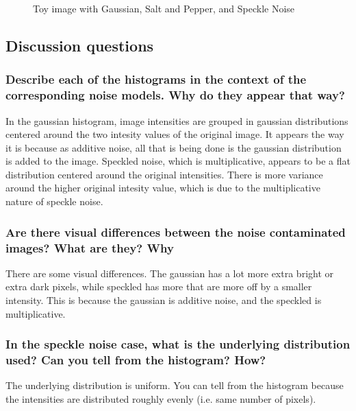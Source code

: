 \documentclass[article, 1.5space, letterpaper, 12pt, oneside, header, footer]{SydeClass}
\begin{document}
\begin{figure}[ht]
{	}
	\caption{Toy image with Gaussian, Salt and Pepper, and Speckle Noise}
	\label{fig:noiseGeneration.toy}
\end{figure}
 

\subsection{Discussion questions}

\subsubsection{ Describe each of the histograms in the context of the corresponding noise models. Why do they appear
that way?}
In the gaussian histogram, image intensities are grouped in gaussian distributions centered around the two intesity values of the original image. It appears the way it is because as additive noise, all that is being done is the gaussian distribution is added to the image. Speckled noise, which is multiplicative, appears to be a flat distribution centered around the original intensities. There is more variance around the higher original intesity value, which is due to the multiplicative nature of speckle noise.

\subsubsection{Are there visual differences between the noise contaminated images? What are they? Why}
There are some visual differences. The gaussian has a lot more extra bright or extra dark pixels, while speckled has more that are more off by a smaller intensity. This is because the gaussian is additive noise, and the speckled is multiplicative.

\subsubsection{In the speckle noise case, what is the underlying distribution used? Can you tell from the histogram?
How?}
The underlying distribution is uniform. You can tell from the histogram because the intensities are distributed roughly evenly (i.e. same number of pixels). 
\end{document}
